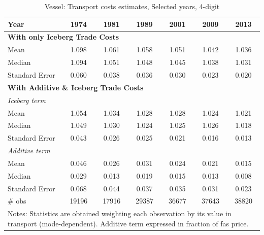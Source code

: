 \documentclass[a4paper,11pt]{article}
\begin{document}
\begin{table}[htbp]
  \centering
\caption{Vessel: Transport costs estimates, Selected years, 4-digit}
\begin{center}
    \begin{tabular}{l|cccccc}
   \hline\hline
Year & 1974  & 1981  & 1989  & 2001  & 2009  & 2013 \\
\hline
\multicolumn{7}{l}{\textbf{With only Iceberg Trade Costs}} \\
Mean  & 1.098 & 1.061 & \multicolumn{1}{c}{1.058} & \multicolumn{1}{c}{1.051} & \multicolumn{1}{c}{1.042} & \multicolumn{1}{c}{1.036}  \\
Median & 1.094 & 1.051 & \multicolumn{1}{c}{1.048} & \multicolumn{1}{c}{1.045} & \multicolumn{1}{c}{1.038} & \multicolumn{1}{c}{1.031} \\
Standard Error & 0.060 & 0.038 & \multicolumn{1}{c}{0.036} & \multicolumn{1}{c}{0.030} & \multicolumn{1}{c}{0.023} & \multicolumn{1}{c}{0.020} \\
\hline
\multicolumn{7}{l}{\textbf{With Additive \& Iceberg Trade Costs } }\\ \hline
\textit{Iceberg term} &       &       &       &       &       &     \\
Mean  & 1.054 & 1.034 & \multicolumn{1}{c}{1.028} & \multicolumn{1}{c}{1.028} & \multicolumn{1}{c}{1.024} & \multicolumn{1}{c}{1.021}  \\
Median & 1.049 & 1.030 & \multicolumn{1}{c}{1.024} & \multicolumn{1}{c}{1.025} & \multicolumn{1}{c}{1.026} & \multicolumn{1}{c}{1.018} \\
Standard Error & 0.043 & 0.026 & \multicolumn{1}{c}{0.025} & \multicolumn{1}{c}{0.021} & \multicolumn{1}{c}{0.016} & \multicolumn{1}{c}{0.013}  \\
\textit{Additive term} &       &       &       &       &       &     \\
Mean  & 0.046 & 0.026 & \multicolumn{1}{c}{0.031} & \multicolumn{1}{c}{0.024} & \multicolumn{1}{c}{0.021} & \multicolumn{1}{c}{0.015}  \\
Median & 0.029 & 0.013 & \multicolumn{1}{c}{0.019} & \multicolumn{1}{c}{0.015} & \multicolumn{1}{c}{0.013} & \multicolumn{1}{c}{0.008} \\
Standard Error & 0.068 & 0.044 & \multicolumn{1}{c}{0.037} & \multicolumn{1}{c}{0.035} & \multicolumn{1}{c}{0.031} & \multicolumn{1}{c}{0.023} \\ \hline
\# obs & 19196 & 17916 & \multicolumn{1}{c}{29387} & \multicolumn{1}{c}{36677} & \multicolumn{1}{c}{37643} & \multicolumn{1}{c}{38820} \\
\hline\hline
\multicolumn{7}{l}{\parbox[l]{11cm}{ \vspace{7pt}\scriptsize{Notes: Statistics are obtained weighting each observation by its value in transport (mode-dependent). Additive term expressed in fraction of fas price.}}}
\end{tabular}%
\end{center}
\label{tab:result_ves_rob}%
\end{table}%
\end{document}

